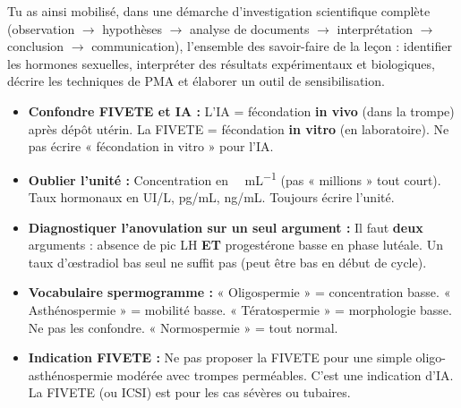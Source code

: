 \documentclass[11pt]{article}
\begin{document}
Tu as ainsi mobilisé, dans une démarche d'investigation scientifique complète (observation $\rightarrow$ hypothèses $\rightarrow$ analyse de documents $\rightarrow$ interprétation $\rightarrow$ conclusion $\rightarrow$ communication), l'ensemble des savoir-faire de la leçon : identifier les hormones sexuelles, interpréter des résultats expérimentaux et biologiques, décrire les techniques de PMA et élaborer un outil de sensibilisation.

\begin{attention}
\begin{itemize}
\item \textbf{Confondre FIVETE et IA :} L'IA = fécondation \textbf{in vivo} (dans la trompe) après dépôt utérin. La FIVETE = fécondation \textbf{in vitro} (en laboratoire). Ne pas écrire « fécondation in vitro » pour l'IA.
\item \textbf{Oublier l'unité :} Concentration en \SI{}{\million\per\mL} (pas « millions » tout court). Taux hormonaux en UI/L, pg/mL, ng/mL. Toujours écrire l'unité.
\item \textbf{Diagnostiquer l'anovulation sur un seul argument :} Il faut \textbf{deux} arguments : absence de pic LH \textbf{ET} progestérone basse en phase lutéale. Un taux d'{\oe}stradiol bas seul ne suffit pas (peut être bas en début de cycle).
\item \textbf{Vocabulaire spermogramme :} « Oligospermie » = concentration basse. « Asthénospermie » = mobilité basse. « Tératospermie » = morphologie basse. Ne pas les confondre. « Normospermie » = tout normal.
\item \textbf{Indication FIVETE :} Ne pas proposer la FIVETE pour une simple oligo-asthénospermie modérée avec trompes perméables. C'est une indication d'IA. La FIVETE (ou ICSI) est pour les cas sévères ou tubaires.
\end{itemize}
\end{attention}
\end{document}
